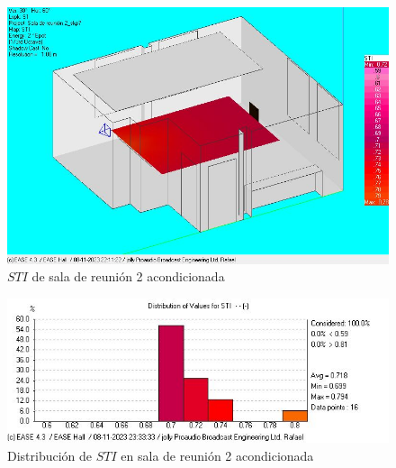 \begin{figure}[H]
    \centering
    \includegraphics[width=12cm]{Imagenes/STI acondicionado/STI_Reunion2_ConAcond.jpg}
    \caption{$STI$ de sala de reunión 2 acondicionada}
    \label{fig: STI sala2 acond}
\end{figure}
\begin{figure}[H]
    \centering
    \includegraphics[width=12cm]{Imagenes/STI acondicionado/STIdist_Reunion1_ConAcond.jpg}
    \caption{Distribución de $STI$ en sala de reunión 2 acondicionada}
    \label{fig: distribucion STI sala2 acond}
\end{figure}